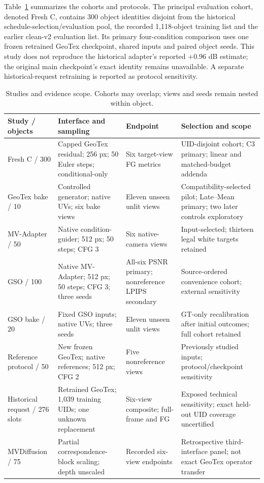 \documentclass[times,twocolumn,final]{elsarticle}
\begin{document}
Table~\ref{tab:study-design} summarizes the cohorts and protocols. The principal evaluation cohort, denoted Fresh C, contains 300 object identities disjoint from the historical schedule-selection/evaluation pool, the recorded 1,118-object training list and the earlier clean-v2 evaluation list. Its primary four-condition comparison uses one frozen retrained GeoTex checkpoint, shared inputs and paired object seeds. This study does not reproduce the historical adapter's reported $+0.96$ dB estimate; the original main checkpoint's exact identity remains unavailable. A separate historical-request retraining is reported as protocol sensitivity.

\begin{table}[t]
\centering\footnotesize\setlength{\tabcolsep}{3.5pt}\renewcommand{\arraystretch}{1.08}
\caption{Studies and evidence scope. Cohorts may overlap; views and seeds remain nested within object.}
\label{tab:study-design}
\begin{tabular}{p{}p{}p{}p{}}
\toprule Study / objects & Interface and sampling & Endpoint & Selection and scope \\
\midrule
Fresh C / 300 & Capped GeoTex residual; 256 px; 50 Euler steps; conditional-only & Six target-view FG metrics & UID-disjoint cohort; C3 primary; linear and matched-budget addenda \\
GeoTex bake / 10 & Controlled generator; native UVs; six bake views & Eleven unseen unlit views & Compatibility-selected pilot; Late--Mean primary; two later controls exploratory \\
MV-Adapter / 50 & Native condition-guider; 512 px; 50 steps; CFG 3 & Six native-camera views & Input-selected; thirteen legal white targets retained \\
GSO / 100 & Native MV-Adapter; 512 px; 50 steps; CFG 3; three seeds & All-six PSNR primary; nonreference LPIPS secondary & Source-ordered convenience cohort; external sensitivity \\
GSO bake / 20 & Fixed GSO inputs; native UVs; three seeds & Eleven unseen unlit views & GT-only recalibration after initial outcomes; full cohort retained \\
Reference protocol / 50 & New frozen GeoTex; native references; 512 px; CFG 2 & Five nonreference views & Previously studied inputs; protocol/checkpoint sensitivity \\
Historical request / 276 slots & Retrained GeoTex; 1,039 training UIDs; one unknown replacement & Six-view composite; full-frame and FG & Exposed technical sensitivity; exact held-out UID coverage uncertified \\
MVDiffusion / 75 & Partial correspondence-block scaling; depth unscaled & Recorded six-view endpoints & Retrospective third-interface panel; not exact GeoTex operator transfer \\
\bottomrule
\end{tabular}
\end{table}
\end{document}
